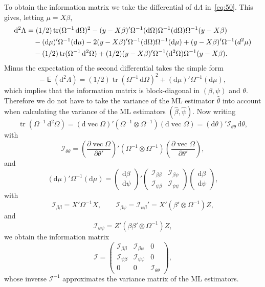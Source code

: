 \documentclass[12pt,a4paper]{article}
\theoremstyle{definition}
\DeclareMathOperator\expc{\mathsf{E}}
\DeclareMathOperator{\tr}{tr}
\DeclareMathOperator{\avec}{vec}
\newcommand{\dd}{\mathrm{d}}
\begin{document}
To obtain the information matrix we take the differential of $\dd\Lambda$ in~\eqref{eq:50}. This gives, letting $\mu = X\beta$,
\begin{align}\label{eq:52}
\dd^2\Lambda &= (1/2)\tr(\Omega^{-1}\, \dd\Omega)^2 - (y - X\beta)'\Omega^{-1}(\dd\Omega)\Omega^{-1}(\dd\Omega)\Omega^{-1}(y - X\beta) \notag \\
&\quad - (\dd\mu)'\Omega^{-1}(\dd\mu) - 2(y - X\beta)'\Omega^{-1}(\dd\Omega)\Omega^{-1}(\dd\mu) + (y - X\beta)'\Omega^{-1}(d^2\mu) \notag \\
&\quad - (1/2)\tr(\Omega^{-1}\, \dd^2\Omega) + (1/2)(y - X\beta)'\Omega^{-1}(\dd^2\Omega)\Omega^{-1}(y - X\beta).
\end{align}
Minus the expectation of the second differential takes the simple form
\[
-\expc(\dd^2\Lambda) = (1/2)\tr(\Omega^{-1}\, \dd\Omega)^2 + (\dd\mu)'\Omega^{-1}(\dd\mu),
\]
which implies that the information matrix is block-diagonal in $(\beta, \psi)$ and $\theta$. Therefore we do not have to take the variance of the ML estimator $\hat{\theta}$ into account when calculating the variance of the ML estimators $(\hat{\beta}, \hat{\psi})$. %
Now writing
\[
\tr(\Omega^{-1}\, \dd^2\Omega) = (\dd\avec\Omega)'(\Omega^{-1} \otimes \Omega^{-1})(\dd\avec\Omega) = (\dd\theta)'\mathcal{I}_{\theta\theta}\, \dd\theta,
\]
with
\[
\mathcal{I}_{\theta\theta} = \left(\frac{\partial \avec\Omega}{\partial \theta'}\right)' (\Omega^{-1} \otimes \Omega^{-1}) \left(\frac{\partial \avec\Omega}{\partial \theta'}\right),
\]
and
\[
(\dd\mu)'\Omega^{-1}(\dd\mu) = \begin{pmatrix} \dd\beta \\ \dd\psi \end{pmatrix}' \begin{pmatrix} \mathcal{I}_{\beta\beta} & \mathcal{I}_{\beta\psi} \\ \mathcal{I}_{\psi\beta} & \mathcal{I}_{\psi\psi} \end{pmatrix} \begin{pmatrix} \dd\beta \\ \dd\psi \end{pmatrix},
\]
with
\[
\mathcal{I}_{\beta\beta} = X'\Omega^{-1}X, \qquad
\mathcal{I}_{\beta\psi} = \mathcal{I}_{\psi\beta}' = X'(\beta' \otimes \Omega^{-1})Z,
\]
and
\[
\mathcal{I}_{\psi\psi} = Z'(\beta\beta' \otimes \Omega^{-1})Z,
\]
we obtain the information matrix
\[
\mathcal{I} = \begin{pmatrix}
\mathcal{I}_{\beta\beta} & \mathcal{I}_{\beta\psi} & 0 \\
\mathcal{I}_{\psi\beta} & \mathcal{I}_{\psi\psi} & 0 \\
0 & 0 & \mathcal{I}_{\theta\theta}
\end{pmatrix},
\]
whose inverse $\mathcal{I}^{-1}$ approximates the variance matrix of the ML estimators. %
\end{document}
